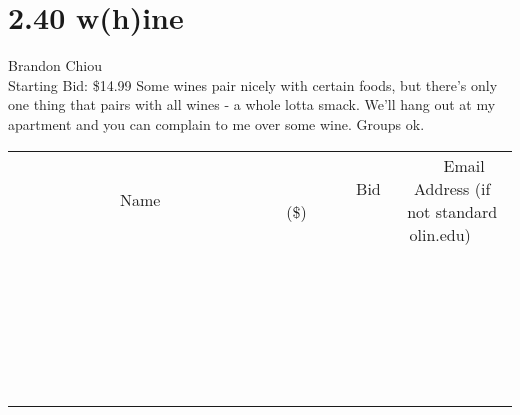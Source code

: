 \documentclass[11pt]{article}
\begin{document}
\section*{2.40 w(h)ine}
Brandon Chiou
\\
Starting Bid: \$14.99
\newline
Some wines pair nicely with certain foods, but there's only one thing that pairs with all wines - a whole lotta smack. We'll hang out at my apartment and you can complain to me over some wine. Groups ok.
\\[6ex]
\begin{tabular}{c c c}
~~~~~~~~~~~~~Name~~~~~~~~~~~~~ & ~~~~~~~~~Bid (\$)~~~~~~~~~  & ~~~Email Address (if not standard olin.edu)~~~\\
 & & \\
\hline
 & & \\
\hline
 & & \\
\hline
 & & \\
\hline
 & & \\
\hline
 & & \\
\hline
 & & \\
\hline
 & & \\
\hline
 & & \\
\hline
 & & \\
\hline
 & & \\
\hline
 & & \\
\hline
 & & \\
\hline
 & & \\
\hline
 & & \\
\hline
 & & \\
\hline
 & & \\
\hline
 & & \\
\hline
 & & \\
\hline
 & & \\
\hline
 & & \\
\hline
 & & \\
\hline
 & & \\
\hline
 & & \\
\hline
 & & \\
\hline
 & & \\
\hline
\end{tabular}
\newpage
\end{document}
